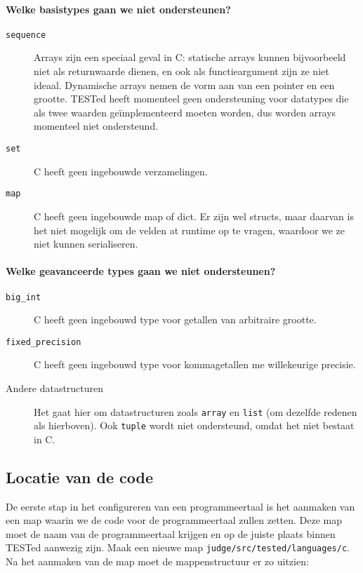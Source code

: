 \paragraph{Welke basistypes gaan we niet ondersteunen?}

\begin{description}
    \item[\texttt{sequence}] Arrays zijn een speciaal geval in C: statische arrays kunnen bijvoorbeeld niet als returnwaarde dienen, en ook als functieargument zijn ze niet ideaal.
    Dynamische arrays nemen de vorm aan van een pointer en een grootte. 
    TESTed heeft momenteel geen ondersteuning voor datatypes die als twee waarden geïmplementeerd moeten worden, dus worden arrays momenteel niet ondersteund.
    \item[\texttt{set}] C heeft geen ingebouwde verzamelingen.
    \item[\texttt{map}] C heeft geen ingebouwde map of dict.
    Er zijn wel structs, maar daarvan is het niet mogelijk om de velden at runtime op te vragen, waardoor we ze niet kunnen serialiseren.
\end{description}

\paragraph{Welke geavanceerde types gaan we niet ondersteunen?}

\begin{description}
    \item[\texttt{big\_int}] C heeft geen ingebouwd type voor getallen van arbitraire grootte.
    \item[\texttt{fixed\_precision}] C heeft geen ingebouwd type voor
    kommagetallen me willekeurige precisie.
    \item[Andere datastructuren] Het gaat hier om datastructuren zoals \texttt{array} en \texttt{list} (om dezelfde redenen als hierboven).
    Ook \texttt{tuple} wordt niet ondersteund, omdat het niet bestaat in C\@.
\end{description}

\subsection{Locatie van de code}\label{subsec:locatie-van-de-code}

De eerste stap in het configureren van een programmeertaal is het aanmaken van een map waarin we de code voor de programmeertaal zullen zetten.
Deze map moet de naam van de programmeertaal krijgen en op de juiste plaats binnen TESTed aanwezig zijn.
Maak een nieuwe map \texttt{judge/src/tested/languages/c}.
Na het aanmaken van de map moet de mappenstructuur er zo uitzien:


